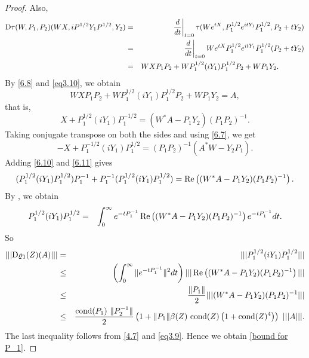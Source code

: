 \documentclass[12pt,epsfig,reqno]{amsart}
\newcommand{\De}{{\rm D}}
\theoremstyle{remark}
\newcommand{\h}{\mathop{{\rm Re}}}
\begin{document}
\begin{proof}
Also,
\begin{eqnarray}
\De \tau(W, P_1,P_2)(W X, i P^{1/2} Y_1 P^{1/2}, Y_2)&=&\left.\frac{d}{dt}\right|_{t=0} \tau(We^{tX}, P_1^{1/2} e^{itY_1} P_1^{1/2}, P_2+t Y_2)\nonumber\\
&=&\left.\frac{d}{dt}\right|_{t=0} We^{tX} P_1^{1/2} e^{itY_1} P_1^{1/2} (P_2+t Y_2)\nonumber\\
&=& WXP_1P_2+W P_1^{1/2} (i Y_1)P_1^{1/2} P_2+WP_1 Y_2. \hspace{1.2cm}\label{eq3.10}
\end{eqnarray}
By \eqref{6.8} and \eqref{eq3.10}, we obtain
\begin{equation}
WXP_1P_2+W P_1^{1/2} (i Y_1)P_1^{1/2} P_2+WP_1 Y_2=A, \label{new}
\end{equation}
that is,
\begin{equation}
X+P_1^{1/2} (i Y_1) P_1^{-1/2}=(W^*A-P_1 Y_2)(P_1 P_2)^{-1}.\label{6.10}
\end{equation}
Taking conjugate transpose on both the sides and using \eqref{6.7}, we get
\begin{equation}
-X+P_1^{-1/2} (i Y_1) P_1^{1/2}=(P_1 P_2)^{-1}(A^*W-Y_2 P_1).\label{6.11}
\end{equation}
Adding \eqref{6.10} and \eqref{6.11} gives
$$(P_1^{1/2} (i Y_1)P_1^{1/2}) P_1^{-1}+ P_1^{-1} (P_1^{1/2} (i Y_1)P_1^{1/2})=\h \left((W^*A-P_1 Y_2)(P_1 P_2)^{-1}\right).$$
By \cite[Theorem VII.2.3]{bhatia_matrix_analysis}, we obtain
\begin{eqnarray}
P_1^{1/2} (i Y_1)P_1^{1/2}
&=& \int_0^{\infty} e^{-tP_1^{-1}} \h \left((W^*A-P_1 Y_2)(P_1 P_2)^{-1}\right)  e^{-tP_1^{-1}} dt.\label{6.13}
\end{eqnarray}
So
\begin{eqnarray*}
|||\De \varrho_1(Z)(A)|||&=& |||P_1^{1/2} (i Y_1)P_1^{1/2}|||\\
&\leq & \left(\int_0^{\infty} \|e^{-tP_1^{-1}}\|^2 dt\right)|||\h \left((W^*A-P_1 Y_2)(P_1 P_2)^{-1}\right)|||\\
&\leq& \frac{\|P_1\|}{2} |||(W^*A-P_1 Y_2)(P_1 P_2)^{-1}|||\\
&\leq& \frac{\text{\rm cond} (P_1) \ \|P_2^{-1}\| }{2 } \left(1+\|P_1\| \beta(Z)\
\text{\rm cond} (Z)  \left(1+\text{\rm cond}(Z)^4\right)\right)\ |||A|||.
\end{eqnarray*}
The last inequality follows from \eqref{4.7} and \eqref{eq3.9}. Hence we obtain \eqref{bound for P_1}.


\end{proof}
\end{document}
